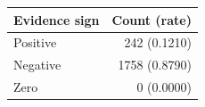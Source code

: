 \begin{tabular}{lr}
\hline
Evidence sign & Count (rate) \\
\hline
Positive & 242 (0.1210) \\
Negative & 1758 (0.8790) \\
Zero & 0 (0.0000) \\
\hline
\end{tabular}

